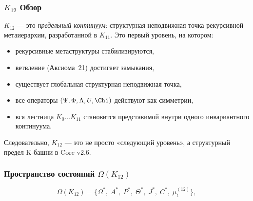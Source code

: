 

\subsubsection{$K_{12}$ Обзор}
\label{sec:k12-overview}

$K_{12}$ — это \emph{предельный континуум}: структурная неподвижная точка
рекурсивной метаиерархии, разработанной в $K_{11}$.
Это первый уровень, на котором:

\begin{itemize}
    \item рекурсивные метаструктуры стабилизируются,
    \item ветвление (Аксиома~21) достигает замыкания,
    \item существует глобальная структурная неподвижная точка,
    \item все операторы $(\Psi,\Phi,\Lambda,U,\Chi)$ действуют как симметрии,
    \item вся лестница $K_0\dots K_{11}$ становится представимой внутри одного
          инвариантного континуума.
\end{itemize}

Следовательно, $K_{12}$ — это не просто «следующий уровень», а структурный
предел K-башни в Core v2.6.

\subsubsection{Пространство состояний $\Omega(K_{12})$}

\[
\Omega(K_{12}) =
\{
\Omega^*,\;
A^*,\;
P^*,\;
\Theta^*,\;
J^*,\;
C^*,\;
\mu^{(12)}_t
\},
\]

